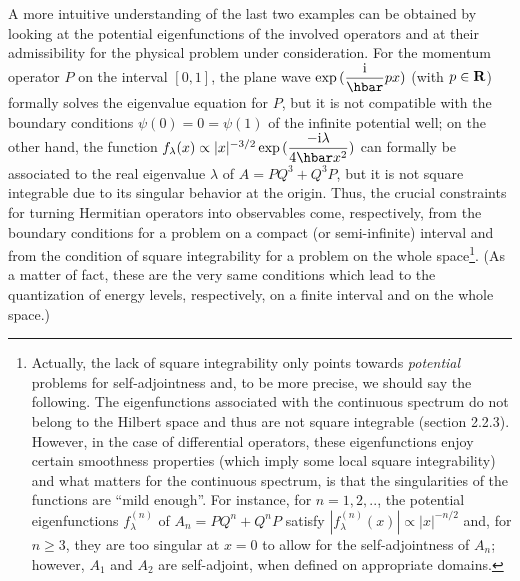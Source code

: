 \documentclass[12pt]{report}
\begin{document}
 A more intuitive understanding of the last two examples 
 can be obtained by looking at the potential eigenfunctions 
 of the involved operators and at their admissibility  
 for the physical problem under consideration. 
 For the momentum operator $P$ on the interval $[0,1]$,
 the plane wave ${\rm exp} \, (\ds{\ri \over \hbar} p x)$ 
 (with $p \in {\bf R}$) formally solves the eigenvalue equation
 for $P$, but it is  
 not compatible with the boundary conditions 
 $\psi (0) = 0 = \psi (1)$ of the infinite potential well; 
 on the other hand, the function
 $f_{\lambda} (x) \propto |x|^{-3/2} \, 
 {\rm exp} \, ( \ds{- \ri \lambda \over 4 \hbar x^2})$ 
can formally  be associated 
to the real eigenvalue $\lambda$ of 
 $A = PQ^3 +Q^3 P$, but it is not square integrable due to its singular
 behavior  at the origin. 
 Thus, the crucial constraints for turning Hermitian operators 
 into observables 
 come, respectively,  from the 
 boundary conditions for a problem on a compact (or semi-infinite)
interval and from the 
 condition of square integrability for a problem 
on the whole space\footnote{Actually, the lack of square 
integrability only points towards {\em potential} problems 
for self-adjointness and, to be more precise, 
we should say the following. The eigenfunctions 
associated with the continuous spectrum do not belong 
to the Hilbert space and thus are not square integrable
(section 2.2.3). However, in the case of differential operators,
these eigenfunctions enjoy certain smoothness properties 
(which imply some local square integrability) and what matters
for the continuous spectrum,  
is that the singularities of the functions
are ``mild enough''. For instance,
for $n =1,2,..$, the potential eigenfunctions $f^{(n)}_{\lambda}$
of $A_n =PQ^n + Q^nP$
satisfy   $|f^{(n)}_{\lambda} (x)| \propto |x|^{-n/2}$
and, for  $n \geq 3$, 
they are too singular at $x=0$ to allow for the self-adjointness
of $A_n$; however, $A_1$ and $A_2$ are self-adjoint,
when defined on appropriate domains.}.    
 (As a matter of fact, these are the very same conditions which lead
  to the quantization of energy levels, respectively,  
 on a finite interval 
 and on the whole space.)
 


\newpage
 
\end{document}
